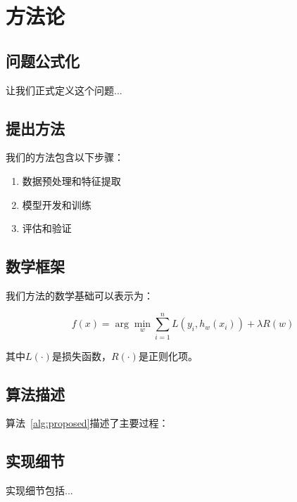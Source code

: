 \section{方法论}
\label{sec:methodology}


\subsection{问题公式化}

让我们正式定义这个问题...

\subsection{提出方法}

我们的方法包含以下步骤：

\begin{enumerate}
    \item 数据预处理和特征提取
    \item 模型开发和训练
    \item 评估和验证
\end{enumerate}

\subsection{数学框架}

我们方法的数学基础可以表示为：

\begin{equation}
f(x) = \arg\min_{w} \sum_{i=1}^{n} L(y_i, h_w(x_i)) + \lambda R(w)
\label{eq:objective}
\end{equation}

其中$L(\cdot)$是损失函数，$R(\cdot)$是正则化项。

\subsection{算法描述}

算法~\ref{alg:proposed}描述了主要过程：


\subsection{实现细节}

实现细节包括...